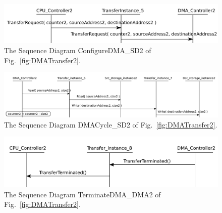 \documentclass{llncs}
\begin{document}
%
\begin{figure}[!htbp]
	\centering
	\includegraphics[width=5in]{figures/evaluation/ConfigureTransfer2.pdf}
	\caption{The Sequence Diagram ConfigureDMA\_SD2 of Fig.~\ref{fig:DMATransfer2}.}
	\label{fig:CP04_4}
\end{figure}
%
\begin{figure}[!htbp]
	\centering
	\includegraphics[width=\textwidth]{figures/evaluation/TransferCycleSD2.pdf}
	\caption{The Sequence Diagram DMACycle\_SD2 of Fig.~\ref{fig:DMATransfer2}.}
	\label{fig:CP04_5}
\end{figure}
%
\begin{figure}[!htbp]
	\centering
	\includegraphics[width=5in]{figures/evaluation/TerminateTransfer2.pdf}
	\caption{The Sequence Diagram TerminateDMA\_DMA2 of Fig.~\ref{fig:DMATransfer2}.}
	\label{fig:CP04_6}
\end{figure}
\end{document}
